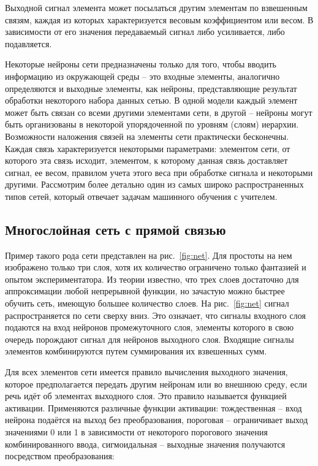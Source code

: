 \documentclass[12pt, a4paper, oneside]{article}
\begin{document}
Выходной сигнал элемента может посылаться другим элементам по взвешенным связям, каждая из которых характеризуется весовым коэффициентом или весом. В зависимости от  его значения передаваемый сигнал либо усиливается, либо подавляется. 

Некоторые нейроны сети предназначены только для того, чтобы вводить информацию  из окружающей среды -- это входные элементы, аналогично определяются и выходные элементы, как нейроны, представляющие результат обработки некоторого набора данных сетью. В одной модели каждый элемент может быть связан со всеми другими элементами сети, в другой -- нейроны могут быть организованы в некоторой упорядоченной по уровням (слоям) иерархии. Возможности наложения связей на элементы сети практически бесконечны. Каждая связь характеризуется некоторыми параметрами: элементом сети, от которого эта связь исходит, элементом, к которому данная связь доставляет сигнал, ее весом, правилом учета этого веса при обработке сигнала и некоторыми другими. Рассмотрим более детально один из самых широко  распространенных типов сетей, который отвечает задачам машинного обучения с учителем.

\subsection{Многослойная сеть с прямой связью}

Пример такого рода сети представлен на рис.~\ref{fig:net}. Для простоты на нем изображено только три слоя, хотя их количество  ограничено только фантазией и опытом экспериментатора. Из теории известно, что трех слоев достаточно для аппроксимации любой непрерывной функции, но зачастую можно быстрее обучить сеть, имеющую большее количество слоев. На рис.~\ref{fig:net} сигнал распространяется по сети сверху вниз.  Это означает, что сигналы входного слоя подаются на вход нейронов промежуточного слоя, элементы которого в свою очередь порождают сигнал для нейронов выходного слоя. Входящие сигналы элементов комбинируются путем суммирования их взвешенных сумм.

Для всех элементов сети имеется правило вычисления выходного значения, которое предполагается передать другим нейронам или во внешнюю среду, если речь идёт об элементах выходного слоя. Это правило называется функцией активации. Применяются различные функции активации: тождественная – вход нейрона подаётся на выход без преобразования, пороговая – ограничивает выход значениями 0 или 1 в зависимости от некоторого порогового значения комбинированного ввода, сигмоидальная – выходные значения получаются посредством преобразования:
\end{document}

